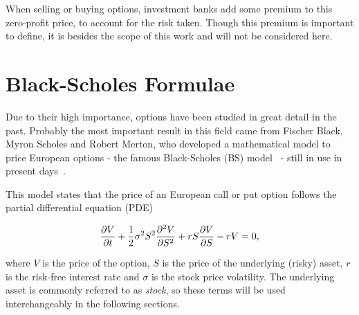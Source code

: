 When selling or buying options, investment banks add some premium to this zero-profit price, to account for the risk taken. Though this premium is important to define, it is besides the scope of this work and will not be considered here.
    
\section{Black-Scholes Formulae}
\label{section:Black-Scholes Formulae}
Due to their high importance, options have been studied in great detail in the past.
Probably the most important result in this field came from Fischer Black, Myron Scholes and Robert Merton, who developed a mathematical model to price European options - the famous Black-Scholes (BS) model~\cite{Scholes} - still in use in present days~\cite{Wilmott3}.

This model states that the price of an European call or put option follows the partial differential equation (PDE)

\begin{equation}\label{BS2}
\pdv{V}{t}+\frac{1}{2}\sigma^2S^2\pdv{^2V}{S^2}+rS\pdv{V}{S}-rV=0,
\end{equation}

\noindent where $V$ is the price of the option, $S$ is the price of the underlying (risky) asset, $r$ is the risk-free interest rate and $\sigma$ is the stock price volatility.
The underlying asset is commonly referred to as \emph{stock}, so these terms will be used interchangeably in the following sections.

